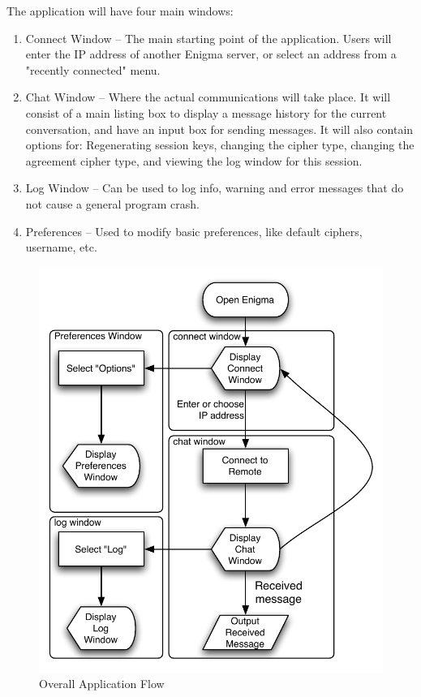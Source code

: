     The application will have four main windows:
    
    \begin{enumerate}
      \item Connect Window -- The main starting point of the application. Users will enter the IP address of another Enigma server, or select an address from a "recently connected" menu.
      \item Chat Window -- Where the actual communications will take place. It will consist of a main listing box to display a message history for the current conversation, and have an input box for sending messages. It will also contain options for: Regenerating session keys, changing the cipher type, changing the agreement cipher type, and viewing the log window for this session.
      \item Log Window -- Can be used to log info, warning and error messages that do not cause a general program crash.
      \item Preferences -- Used to modify basic preferences, like default ciphers, username, etc.
    \end{enumerate}
    
     \begin{figure}
       \centering
       \includegraphics[scale=0.7]{./Figures/Ch6/6-3-1-2a.pdf}
       \caption{Overall Application Flow}
       \label{fig:app_flow}
     \end{figure}
    

